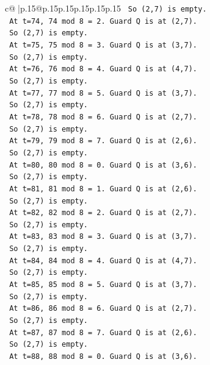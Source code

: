 \documentclass{article}
\begin{document}
{\begin{supertabular}{c@{$\;$}|p{.15\linewidth}@{}p{.15\linewidth}p{.15\linewidth}p{.15\linewidth}p{.15\linewidth}p{.15\linewidth}}
{{{\texttt{    So (2,7) is empty.} \\
\texttt{    At t=74, 74 mod 8 = 2. Guard Q is at (2,7).} \\
\texttt{    So (2,7) is empty.} \\
\texttt{    At t=75, 75 mod 8 = 3. Guard Q is at (3,7).} \\
\texttt{    So (2,7) is empty.} \\
\texttt{    At t=76, 76 mod 8 = 4. Guard Q is at (4,7).} \\
\texttt{    So (2,7) is empty.} \\
\texttt{    At t=77, 77 mod 8 = 5. Guard Q is at (3,7).} \\
\texttt{    So (2,7) is empty.} \\
\texttt{    At t=78, 78 mod 8 = 6. Guard Q is at (2,7).} \\
\texttt{    So (2,7) is empty.} \\
\texttt{    At t=79, 79 mod 8 = 7. Guard Q is at (2,6).} \\
\texttt{    So (2,7) is empty.} \\
\texttt{    At t=80, 80 mod 8 = 0. Guard Q is at (3,6).} \\
\texttt{    So (2,7) is empty.} \\
\texttt{    At t=81, 81 mod 8 = 1. Guard Q is at (2,6).} \\
\texttt{    So (2,7) is empty.} \\
\texttt{    At t=82, 82 mod 8 = 2. Guard Q is at (2,7).} \\
\texttt{    So (2,7) is empty.} \\
\texttt{    At t=83, 83 mod 8 = 3. Guard Q is at (3,7).} \\
\texttt{    So (2,7) is empty.} \\
\texttt{    At t=84, 84 mod 8 = 4. Guard Q is at (4,7).} \\
\texttt{    So (2,7) is empty.} \\
\texttt{    At t=85, 85 mod 8 = 5. Guard Q is at (3,7).} \\
\texttt{    So (2,7) is empty.} \\
\texttt{    At t=86, 86 mod 8 = 6. Guard Q is at (2,7).} \\
\texttt{    So (2,7) is empty.} \\
\texttt{    At t=87, 87 mod 8 = 7. Guard Q is at (2,6).} \\
\texttt{    So (2,7) is empty.} \\
\texttt{    At t=88, 88 mod 8 = 0. Guard Q is at (3,6).} \\
}}}
\end{supertabular}}
\end{document}
